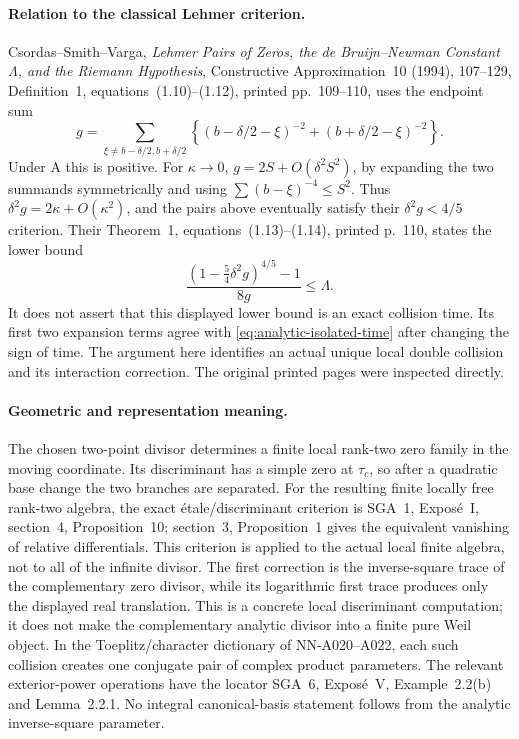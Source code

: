 \paragraph{Relation to the classical Lehmer criterion.}
Csordas--Smith--Varga, \emph{Lehmer Pairs of Zeros, the
de Bruijn--Newman Constant $\Lambda$, and the Riemann
Hypothesis}, Constructive Approximation~10 (1994), 107--129,
Definition~1, equations~(1.10)--(1.12), printed pp.~109--110,
uses the endpoint sum
\[
 g=\sum_{\xi\ne b-\delta/2,b+\delta/2}
       \left\{(b-\delta/2-\xi)^{-2}
                       +(b+\delta/2-\xi)^{-2}\right\}.
\]
Under A this is positive. For $\kappa\to0$,
$g=2S+O(\delta^2S^2)$, by expanding the two summands
symmetrically and using $\sum(b-\xi)^{-4}\le S^2$.
Thus $\delta^2g=2\kappa+O(\kappa^2)$, and the pairs above
eventually satisfy their $\delta^2g<4/5$ criterion.
Their Theorem~1, equations~(1.13)--(1.14), printed p.~110,
states the lower bound
\[
 \frac{(1-\tfrac54\delta^2g)^{4/5}-1}{8g}\le\Lambda.
\]
It does not assert that this displayed lower bound is an
exact collision time. Its first two expansion terms agree
with \eqref{eq:analytic-isolated-time} after changing the
sign of time. The argument here identifies an actual
unique local double collision and its interaction correction.
The original printed pages were inspected directly.

\paragraph{Geometric and representation meaning.}
The chosen two-point divisor determines a finite local
rank-two zero family in the moving coordinate. Its
discriminant has a simple zero at $\tau_c$, so after a
quadratic base change the two branches are separated.
For the resulting finite locally free rank-two algebra,
the exact \'{e}tale/discriminant criterion is SGA~1,
Expos\'e~I, section~4, Proposition~10; section~3,
Proposition~1 gives the equivalent vanishing of relative
differentials. This criterion is applied to the actual
local finite algebra, not to all of the infinite divisor.
The first correction is the inverse-square trace of the
complementary zero divisor, while its logarithmic first
trace produces only the displayed real translation.
This is a concrete local discriminant computation; it
does not make the complementary analytic divisor into a
finite pure Weil object. In the Toeplitz/character
dictionary of NN-A020--A022, each such collision creates
one conjugate pair of complex product parameters.
The relevant exterior-power operations have the locator
SGA~6, Expos\'e~V, Example~2.2(b) and Lemma~2.2.1.
No integral canonical-basis statement follows from
the analytic inverse-square parameter.


